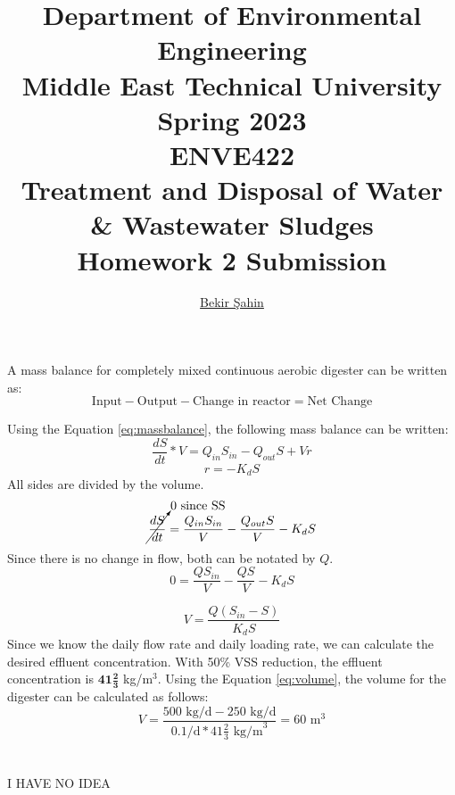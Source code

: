 \documentclass[a4paper]{article}
\title{Department of Environmental Engineering\\Middle East Technical University\\Spring 2023\\ENVE422\\Treatment and Disposal of Water \& Wastewater Sludges\\Homework 2 Submission} %
\author{\href{sahin.bekir@metu.edu.tr}{Bekir Şahin}} %
\begin{document}
\setcounter{page}{0}
\onehalfspacing
\maketitle %
\thispagestyle{empty}
\listoftodos
\newpage
\section{}
A mass balance for completely mixed continuous aerobic digester\autocite{metcalf2014} can be written as:
\begin{equation}
    \text{Input} - \text{Output} - \text{Change in reactor} = \text{Net Change} \label{eq:massbalance}
\end{equation}
\begin{minipage}[c]{0.5\textwidth}
Using the Equation \ref{eq:massbalance}, the following mass balance can be written:
$$\frac{dS}{dt}*V = Q_{in} S_{in} - Q_{out} S + V r$$
$$r = -K_dS$$
All sides are divided by the volume.
$$\cancelto{\text{0 since SS}}{\frac{dS}{dt}} = \frac{Q_{in} S_{in}}{V} - \frac{Q_{out} S}{V} - K_dS$$
Since there is no change in flow, both can be notated by $Q$.
$$0 = \frac{Q S_{in}}{V} - \frac{Q S}{V} - K_d S$$
\end{minipage}
\hfill
\begin{minipage}{0.4\textwidth}
\end{minipage}
\begin{equation}
    V = \frac{Q (S_{in} -  S)}{K_d S } \label{eq:volume}
\end{equation}
Since we know the daily flow rate and daily loading rate, we can calculate the desired effluent concentration. With 50\% VSS reduction, the effluent concentration is $\mathbf{41\frac{2}{3}}$ kg/m$^3$. Using the Equation \ref{eq:volume}, the volume for the digester can be calculated as follows:
$$V=\frac{500\text{ kg/d}-250\text{ kg/d}}{0.1\text{/d}*41\frac{2}{3}\text{ kg/m}^3}=\boxed{60 \text{ m}^3}$$

\section{}
I HAVE NO IDEA \cite{vesilind1988}
\end{document}
